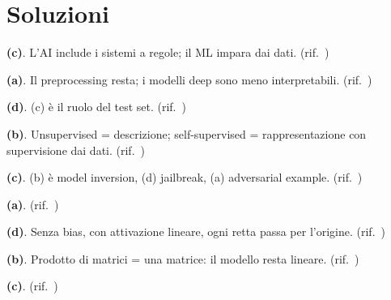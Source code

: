 \section{Soluzioni}
\label{sec:quiz-soluzioni}


\begin{soluzione}
\textbf{(c)}. L'AI include i sistemi a regole; il ML impara dai dati. (rif.\ )
\end{soluzione}

\begin{soluzione}
\textbf{(a)}. Il preprocessing resta; i modelli deep sono meno interpretabili. (rif.\ )
\end{soluzione}

\begin{soluzione}
\textbf{(d)}. (c) è il ruolo del test set. (rif.\ )
\end{soluzione}

\begin{soluzione}
\textbf{(b)}. Unsupervised = descrizione; self-supervised = rappresentazione con supervisione dai dati. (rif.\ )
\end{soluzione}

\begin{soluzione}
\textbf{(c)}. (b) è model inversion, (d) jailbreak, (a) adversarial example. (rif.\ )
\end{soluzione}

\begin{soluzione}
\textbf{(a)}. (rif.\ )
\end{soluzione}

\begin{soluzione}
\textbf{(d)}. Senza bias, con attivazione lineare, ogni retta passa per l'origine. (rif.\ )
\end{soluzione}

\begin{soluzione}
\textbf{(b)}. Prodotto di matrici = una matrice: il modello resta lineare. (rif.\ )
\end{soluzione}

\begin{soluzione}
\textbf{(c)}. (rif.\ )
\end{soluzione}

